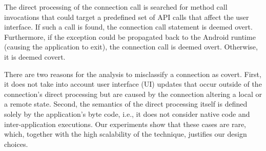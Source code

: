 The direct processing of the connection call is searched for method
call invocations that could target a predefined set of API calls that
affect the user interface.  If such a call is found, the connection
call statement is deemed overt.  Furthermore, if the exception
could be propagated back to the Android runtime (causing the
application to exit), the connection call is deemed overt.
Otherwise, it is deemed covert.




There are two reasons for the analysis to misclassify a connection as covert. 
First, it does not take into account user interface (UI) updates that occur outside of the connection's direct processing but are caused by the connection altering a local or a remote state. 
Second, the semantics of the direct processing itself is defined solely by the application's byte code, i.e., it does not consider native code and inter-application executions. 
Our experiments show that these cases are rare, which, together with the high scalability of the technique, justifies our design choices.

